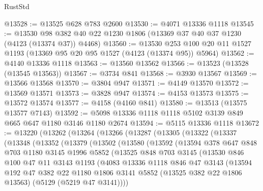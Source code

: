 \begin{lexlean}{RustStd}
\begin{coremodule}
@13528 := @13525 @628 @783 @2600
@13530 := @4071 @13336 @1118
@13545 := @13530 @98 @382 @40 @22 @1230 @1806 (@13369 @37 @40 @37 @1230 (@4123 (@13374 @37)) @4468)
@13560 := @13530 @253 @100 @20 @11 @1527 @1193 (@13369 @95 @20 @95 @1527 (@4123 (@13374 @95)) @5964)
@13562 := @4140 @13336 @1118
@13563 := @13560 @13562
@13566 := @13523 (@13528 (@13545 @13563))
@13567 := @3734 @841
@13568 := @3930 @13567
@13569 := @13566 @13568
@13570 := @3804 @947
@13571 := @4149 @13570
@13572 := @13569 @13571
@13573 := @3828 @947
@13574 := @4153 @13573
@13575 := @13572 @13574
@13577 := @4158 (@4160 @841)
@13580 := @13513 (@13575 @13577 @7143)
@13592 := @5098 @13336 @1118 @1118 @5102 @3139 @849 @665 @647 @1180 @3146 @1180 @2674
@13594 := @5115 @13336 @1118
@13672 := @13220
    (@13262
      (@13264
        (@13266
          (@13287
            (@13305
              (@13322
                (@13337
                  (@13348
                    (@13352
                      (@13379
                        (@13502
                          (@13580
                            (@13592
                              (@13594
                                @378
                                @647
                                @848
                                @703
                                @1180
                                @3145
                                @1996
                                @5852
                                (@13525
                                  @848
                                  @703
                                  @3145
                                  (@13530
                                    @846
                                    @100
                                    @47
                                    @11
                                    @3143
                                    @1193
                                    (@4083
                                      @13336
                                      @1118
                                      @846
                                      @47
                                      @3143
                                      (@13594
                                        @192
                                        @47
                                        @382
                                        @22
                                        @1180
                                        @1806
                                        @3141
                                        @5852
                                        (@13525 @382 @22 @1806 @13563)
                                        (@5129 (@5219 @47 @3141))))

\end{coremodule}
\end{lexlean}
